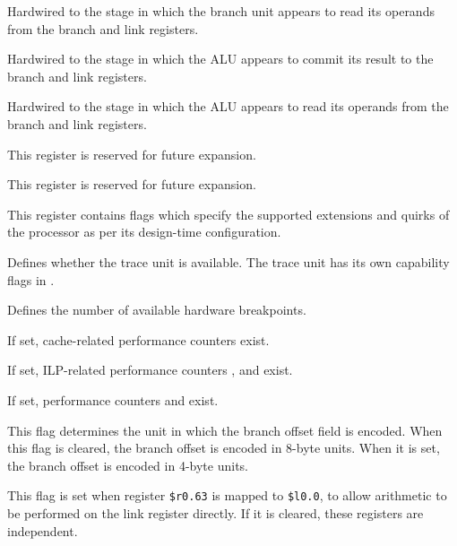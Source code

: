 \reset{****}
Hardwired to the stage in which the branch unit appears to read its operands 
from the branch and link registers.

\reset{****}
Hardwired to the stage in which the ALU appears to commit its result to the
branch and link registers.

\reset{****}
Hardwired to the stage in which the ALU appears to read its operands from the
branch and link registers.


This register is reserved for future expansion.


This register is reserved for future expansion.


This register contains flags which specify the supported extensions and quirks
of the processor as per its design-time configuration.

\reset{***}
Defines whether the trace unit is available. The trace unit has its own
capability flags in .

\reset{***}
Defines the number of available hardware breakpoints.

\reset{*}
If set, cache-related performance counters exist.

\reset{*}
If set, ILP-related performance counters ,  and  exist.

\reset{*}
If set, performance counters  and  exist.

\reset{*}
This flag determines the unit in which the branch offset field is encoded. When
this flag is cleared, the branch offset is encoded in 8-byte units. When it is
set, the branch offset is encoded in 4-byte units.

\reset{*}
This flag is set when register \texttt{\$r0.63} is mapped to \texttt{\$l0.0}, to
allow arithmetic to be performed on the link register directly. If it is
cleared, these registers are independent.

